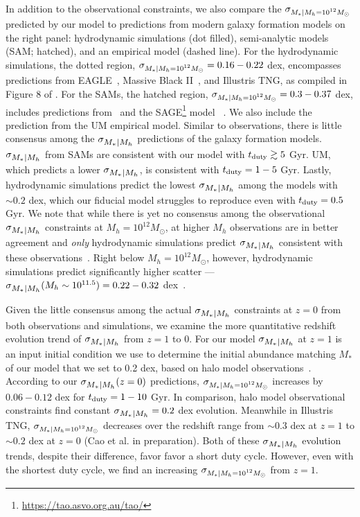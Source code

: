 \documentclass[12pt, letterpaper, preprint, tighten]{aastex62}
\newcommand{\edt}[1]{{\color{dred}{\bf} #1}}
\newcommand{\siglogm}{\sigma_{\scaleto{M_*|M_h}{8pt}}}
\newcommand{\sigtwe}{\sigma_{\scaleto{M_*|M_h=10^{12}M_\odot}{8pt}}}
\begin{document}
In addition to the observational constraints, we also compare the $\sigtwe$
predicted by our model to predictions from modern galaxy formation models
on the right panel: hydrodynamic simulations (dot filled), semi-analytic models
(SAM; hatched), and an empirical model (dashed line). For the hydrodynamic 
simulations, the dotted region, $\sigtwe = 0.16 - 0.22$ dex, encompasses
predictions from EAGLE~\citep{matthee2017}, Massive Black II~\citep{khandai2015},
and Illustris TNG, as compiled in Figure 8 of \cite{wechsler2018}.
For the SAMs, the hatched region, $\sigtwe = 0.3 - 0.37$ dex, includes predictions 
from~\cite{lu2014, somerville2012} and the SAGE\footnote{\url{https://tao.asvo.org.au/tao/}}
model~\edt{\citep{croton2016}}. We also include the prediction from the
\cite{behroozi2019} UM empirical model. Similar to observations, there is 
little consensus among the $\siglogm$ predictions of the galaxy formation models.
$\siglogm$ from SAMs are consistent with our model with $t_{\rm duty} \gtrsim 5$ Gyr. 
UM, which predicts a lower $\siglogm$, is consistent with $t_{\rm duty} = 1 - 5$ Gyr.
Lastly, hydrodynamic simulations predict the lowest $\siglogm$ among the models
with $\sim 0.2$ dex, which our fiducial model struggles to reproduce even with 
$t_{\rm duty} = 0.5$ Gyr. We note that while there is yet no consensus among the 
observational $\siglogm$ constraints at $M_h=10^{12} M_\odot$, at higher $M_h$ 
observations are in better agreement and {\em only} hydrodynamic simulations 
predict $\siglogm$ consistent with these observations~\citep{wechsler2018}. Right 
below $M_h=10^{12}M_\odot$, however, hydrodynamic simulations predict significantly 
higher scatter --- $\siglogm(M_h\sim 10^{11.5}) = 0.22 - 0.32$ dex~\citep{wechsler2018}.

Given the little consensus among the actual $\siglogm$ constraints at $z=0$ 
from both observations and simulations, we examine the more quantitative redshift 
evolution trend of $\siglogm$ from $z=1$ to 0. For our model $\siglogm$ at $z=1$ 
is an input initial condition we
use to determine the initial abundance matching $M_*$ of our model that we set to 0.2 dex, based 
on halo model observations~\citep[\emph{e.g.}][]{leauthaud2012, tinker2013, patel2015}. 
According to our $\siglogm(z=0)$ predictions, $\sigtwe$ increases 
by $0.06 - 0.12$ dex for $t_{\rm duty} = 1-10$ Gyr. In comparison, halo model observational constraints find 
constant $\siglogm=0.2$ dex evolution. Meanwhile in Illustris TNG, $\sigtwe$ 
decreases over the redshift range from $\sim 0.3$ dex at $z=1$ to $\sim 0.2$ dex 
at $z=0$ (Cao et al. in preparation). Both of these $\siglogm$ evolution 
trends, despite their difference, favor favor a short duty cycle. However, even with the 
shortest duty cycle, we find an increasing $\sigtwe$ from $z=1$. 
 
\end{document}
